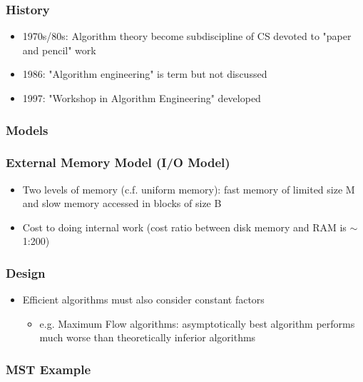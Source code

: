 \subsubsection{History}

\begin{itemize}
    \item 1970s/80s: Algorithm theory become subdiscipline of CS devoted to "paper and pencil" work
    \item 1986: "Algorithm engineering" is term but not discussed
    \item 1997: "Workshop in Algorithm Engineering" developed
\end{itemize}

\subsubsection{Models}

\subsubsection{External Memory Model (I/O Model)}

\begin{itemize}
    \item Two levels of memory (c.f. uniform memory): fast memory of limited size M and slow memory accessed in blocks of size B
    \item Cost to doing internal work (cost ratio between disk memory and RAM is $\sim$ 1:200)
\end{itemize}

\subsubsection{Design}

\begin{itemize}
    \item Efficient algorithms must also consider constant factors
    \begin{itemize}
        \item e.g. Maximum Flow algorithms: asymptotically best algorithm performs much worse than theoretically inferior algorithms
    \end{itemize}
\end{itemize}

\subsubsection{MST Example}

